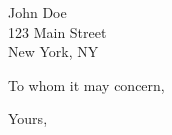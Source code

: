 \documentclass[11pt]{letter}
\begin{document}
\signature{Kyle Daniel Suarez \\ Department of Computer Science \\
Rutgers University \\ New Brunswick, New Jersey}

\begin{letter}{John Doe \\ 123 Main Street \\ New York, NY}

\opening{To whom it may concern,}

\closing{Yours,}
\end{letter}
\end{document}
